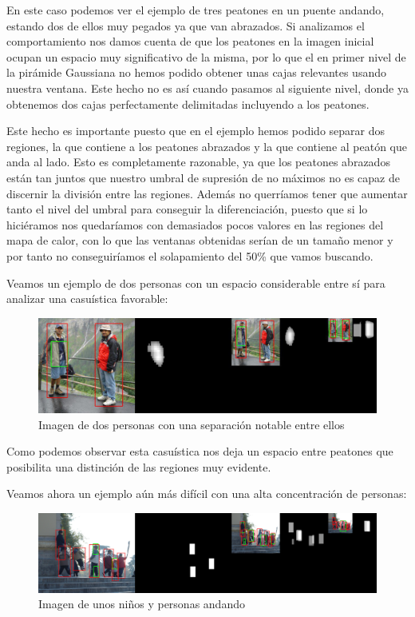 \documentclass[a4paper,12pt]{article}
\begin{document}
En este caso podemos ver el ejemplo de tres peatones en un puente andando, estando dos de ellos muy pegados ya que van abrazados. Si analizamos el comportamiento nos damos cuenta de que los peatones en la imagen inicial ocupan un espacio muy significativo de la misma, por lo que el en primer nivel de la pirámide Gaussiana no hemos podido obtener unas cajas relevantes usando nuestra ventana. Este hecho no es así cuando pasamos al siguiente nivel, donde ya obtenemos dos cajas perfectamente delimitadas incluyendo a los peatones. 

Este hecho es importante puesto que en el ejemplo hemos podido separar dos regiones, la que contiene a los peatones abrazados y la que contiene al peatón que anda al lado. Esto es completamente razonable, ya que los peatones abrazados están tan juntos que nuestro umbral de supresión de no máximos no es capaz de discernir la división entre las regiones. Además no querríamos tener que aumentar tanto el nivel del umbral para conseguir la diferenciación, puesto que si lo hiciéramos nos quedaríamos con demasiados pocos valores en las regiones del mapa de calor, con lo que las ventanas obtenidas serían de un tamaño menor y por tanto no conseguiríamos el solapamiento del 50\% que vamos buscando. 

Veamos un ejemplo de dos personas con un espacio considerable entre sí para analizar una casuística favorable:

\begin{figure}[H]
	\includegraphics[scale=0.43]{./Imagenes/test03.jpg}
	\caption{Imagen de dos personas con una separación notable entre ellos}
\end{figure}

Como podemos observar esta casuística nos deja un espacio entre peatones que posibilita una distinción de las regiones muy evidente.

Veamos ahora un ejemplo aún más difícil con una alta concentración de personas:

\begin{figure}[H]
	\includegraphics[scale=0.11]{./Imagenes/test04.jpg}
	\caption{Imagen de unos niños y personas andando}
\end{figure}
\end{document}
